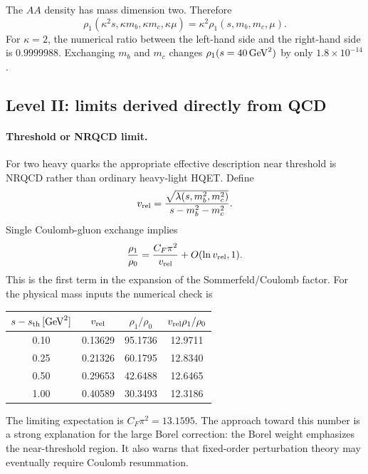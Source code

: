 \documentclass[11pt]{article}
\begin{document}
The \(AA\) density has mass dimension two.  Therefore
\begin{equation}
 \rho_1(\kappa^2s,\kappa m_b,\kappa m_c,\kappa\mu)
 =\kappa^2\rho_1(s,m_b,m_c,\mu).
\end{equation}
For \(\kappa=2\), the numerical ratio between the left-hand side and the
right-hand side is \(0.9999988\).  Exchanging \(m_b\) and \(m_c\) changes
\(\rho_1(s=40\,{\rm GeV}^2)\) by only
\(1.8\times10^{-14}\).

\subsection{Level II: limits derived directly from QCD}

\paragraph{Threshold or NRQCD limit.}
For two heavy quarks the appropriate effective description near threshold
is NRQCD rather than ordinary heavy-light HQET.  Define
\begin{equation}
 v_{\rm rel}
 =\frac{\sqrt{\lambda(s,m_b^2,m_c^2)}}
 {s-m_b^2-m_c^2}.
\end{equation}
Single Coulomb-gluon exchange implies
\begin{equation}
 \frac{\rho_1}{\rho_0}
 =\frac{C_F\pi^2}{v_{\rm rel}}+O(\ln v_{\rm rel},1).
\end{equation}
This is the first term in the expansion of the Sommerfeld/Coulomb factor.
For the physical mass inputs the numerical check is
\begin{center}
\begin{tabular}{cccc}
\toprule
\(s-s_{\rm th}\,[{\rm GeV}^2]\) & \(v_{\rm rel}\) &
\(\rho_1/\rho_0\) & \(v_{\rm rel}\rho_1/\rho_0\)\\
\midrule
0.10 & 0.13629 & 95.1736 & 12.9711\\
0.25 & 0.21326 & 60.1795 & 12.8340\\
0.50 & 0.29653 & 42.6488 & 12.6465\\
1.00 & 0.40589 & 30.3493 & 12.3186\\
\bottomrule
\end{tabular}
\end{center}
The limiting expectation is \(C_F\pi^2=13.1595\).  The approach toward this
number is a strong explanation for the large Borel correction: the Borel
weight emphasizes the near-threshold region.  It also warns that fixed-order
perturbation theory may eventually require Coulomb resummation.
\end{document}
